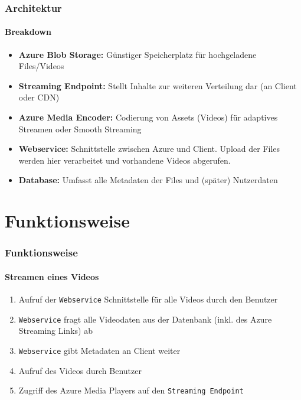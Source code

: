 \documentclass[aspectratio=169]{beamer}
\begin{document}
\begin{frame}
  \frametitle{Architektur}
  \framesubtitle{Breakdown}
  \begin{itemize}
    \item \textbf{Azure Blob Storage:} Günstiger Speicherplatz für hochgeladene Files/Videos
    \item \textbf{Streaming Endpoint:} Stellt Inhalte zur weiteren Verteilung dar (an Client oder CDN)
    \item \textbf{Azure Media Encoder:} Codierung von Assets (Videos) für adaptives Streamen oder Smooth Streaming
    \item \textbf{Webservice:} Schnittstelle zwischen Azure und Client. Upload der Files werden hier verarbeitet und vorhandene Videos abgerufen.
    \item \textbf{Database:} Umfasst alle Metadaten der Files und (später) Nutzerdaten
  \end{itemize}
\end{frame}

\section{Funktionsweise}
\begin{frame}
  \frametitle{Funktionsweise}
  \framesubtitle{Streamen eines Videos}
  \begin{enumerate}
    \item Aufruf der \texttt{Webservice} Schnittstelle für alle Videos durch den Benutzer
    \item \texttt{Webservice} fragt alle Videodaten aus der Datenbank (inkl. des Azure Streaming Links) ab
    \item \texttt{Webservice} gibt Metadaten an Client weiter
    \item Aufruf des Videos durch Benutzer 
    \item Zugriff des Azure Media Players auf den \texttt{Streaming Endpoint}
  \end{enumerate}
\end{frame}
\end{document}
